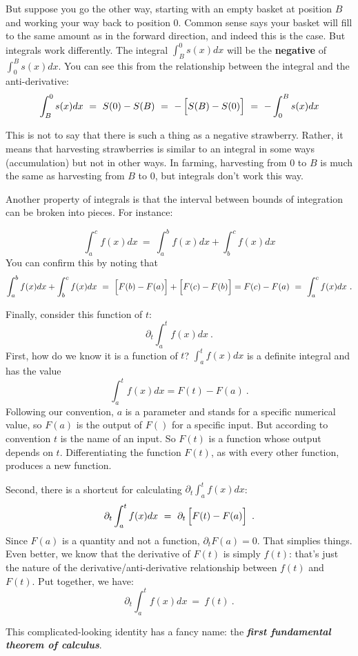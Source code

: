 \documentclass[
  letterpaper,
  DIV=11,
  numbers=noendperiod,
  oneside]{scrreprt}
\begin{document}
But suppose you go the other way, starting with an empty basket at
position \(B\) and working your way back to position 0. Common sense
says your basket will fill to the same amount as in the forward
direction, and indeed this is the case. But integrals work differently.
The integral \(\int_B^0 s(x) dx\) will be the \textbf{negative} of
\(\int_0^B s(x) dx\). You can see this from the relationship between the
integral and the anti-derivative:
\[\int_B^0 s(x) dx \ = \ S(0) - S(B) \ =\ -\left[{\large\strut}S(B) - S(0)\right]\ = \ -\int_0^B s(x) dx\]

This is not to say that there is such a thing as a negative strawberry.
Rather, it means that harvesting strawberries is similar to an integral
in some ways (accumulation) but not in other ways. In farming,
harvesting from 0 to \(B\) is much the same as harvesting from \(B\) to
0, but integrals don't work this way.

Another property of integrals is that the interval between bounds of
integration can be broken into pieces. For instance:

\[\int_a^c f(x) dx \ = \ \int_a^b f(x) dx + \int_b^c f(x) dx\] You can
confirm this by noting that
\[\int_a^b f(x) dx + \int_b^c f(x) dx \ = \ \left[{\large\strut}F(b) - F(a)\right] + \left[{\large\strut}F(c) - F(b)\right] = F(c) - F(a) \ = \ \int_a^c f(x) dx\ .\]

Finally, consider this function of \(t\):
\[\partial_t \int_a^t f(x) dx\ .\] First, how do we know it is a
function of \(t\)? \(\int_a^t f(x) dx\) is a definite integral and has
the value \[\int_a^t f(x) dx = F(t) - F(a)\  .\] Following our
convention, \(a\) is a parameter and stands for a specific numerical
value, so \(F(a)\) is the output of \(F()\) for a specific input. But
according to convention \(t\) is the name of an input. So \(F(t)\) is a
function whose output depends on \(t\). Differentiating the function
\(F(t)\), as with every other function, produces a new function.

Second, there is a shortcut for calculating
\(\partial_t \int_a^t f(x) dx\):
\[\partial_t \int_a^t f(x) dx\ =\ \partial_t \left[{\large\strut}F(t) - F(a)\right]\ .\]
Since \(F(a)\) is a quantity and not a function,
\(\partial_t F(a) = 0\). That simplies things. Even better, we know that
the derivative of \(F(t)\) is simply \(f(t)\): that's just the nature of
the derivative/anti-derivative relationship between \(f(t)\) and
\(F(t)\). Put together, we have:
\[\partial_t \int_a^t f(x) dx\ =\ f(t)\ .\]

This complicated-looking identity has a fancy name: the
\textbf{\emph{first fundamental theorem of calculus}}.
\end{document}

